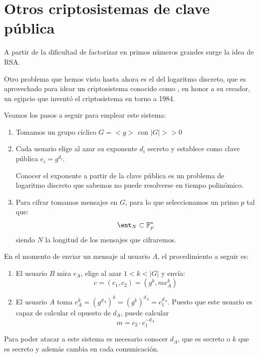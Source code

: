 \section{Otros criptosistemas de clave pública}

A partir de la dificultad de factorizar en primos números grandes surge la idea de RSA.

Otro problema que hemos visto hasta ahora es el del logaritmo discreto, que es aprovechado para idear un criptosistema conocido como , en honor a su creador, un egipcio que inventó el criptosistema en torno a 1984.

Veamos los pasos a seguir para emplear este sistema:
\begin{enumerate}
\item Tomamos un grupo cíclico $G=<g>$ con $|G| >> 0$

\item Cada usuario elige al azar su exponente $d_i$ secreto y establece como clave pública $e_i=g^{d_i}$.

Conocer el exponente a partir de la clave pública es un problema de logaritmo discreto que sabemos no puede resolverse en tiempo polinómico.

\item Para cifrar tomamos mensajes en $G$, para lo que seleccionamos un primo $p$ tal que:
\[\ent_N \subset \mathbb{F}_p^*\]
siendo $N$ la longitud de los mensajes que cifraremos.
\end{enumerate}

En el momento de enviar un mensaje al usuario $A$, el procedimiento a seguir es:
\begin{enumerate}
\item El usuario $B$ mira $e_A$, elige al azar $1<k<|G|$ y envía:
\[c=(c_1,c_2)=(g^k,me_A^k)\]

\item El usuario $A$ toma $e_A^k = (g^{d_A})^k = (g^k)^{d_A}=c_1^{d_A}$. Puesto que  este usuario es capaz de calcular el opuesto de $d_A$, puede calcular
\[m = c_2\cdot c_1^{-d_A}\]
\end{enumerate}

Para poder atacar a este sistema es necesario conocer $d_A$, que es secreto o $k$ que es secreto y además cambia en cada comunicación.